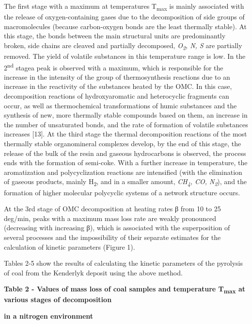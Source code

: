 \begin{multicols}{2}
The first stage with a maximum at temperatures T\textsubscript{max} is
mainly associated with the release of oxygen-containing gases due to the
decomposition of side groups of macromolecules (because carbon-oxygen
bonds are the least thermally stable). At this stage, the bonds between
the main structural units are predominantly broken, side chains are
cleaved and partially decomposed, \emph{O\textsubscript{2}, N, S} are
partially removed. The yield of volatile substances in this temperature
range is low. In the 2\textsuperscript{nd} stagea peak is observed with
a maximum, which is responsible for the increase in the intensity of the
group of thermosynthesis reactions due to an increase in the reactivity
of the substances heated by the OMC. In this case, decomposition
reactions of hydroxyaromatic and heterocyclic fragments can occur, as
well as thermochemical transformations of humic substances and the
synthesis of new, more thermally stable compounds based on them, an
increase in the number of unsaturated bonds, and the rate of formation
of volatile substances increases {[}13{]}. At the third stage the
thermal decomposition reactions of the most thermally stable
organomineral complexes develop, by the end of this stage, the release
of the bulk of the resin and gaseous hydrocarbons is observed, the
process ends with the formation of semi-coke. With a further increase in
temperature, the aromatization and polycyclization reactions are
intensified (with the elimination of gaseous products, mainly
H\textsubscript{2}, and in a smaller amount, \emph{CH\textsubscript{4},
CO, N\textsubscript{2}}), and the formation of higher molecular
polycyclic systems of a network structure occurs.

At the 3rd stage of OMC decomposition at heating rates β from 10 to 25
deg/min, peaks with a maximum mass loss rate are weakly pronounced
(decreasing with increasing β), which is associated with the
superposition of several processes and the impossibility of their
separate estimates for the calculation of kinetic parameters (Figure 1).

Tables 2-5 show the results of calculating the kinetic parameters of the
pyrolysis of coal from the Kenderlyk deposit using the above method.
\end{multicols}

{\bfseries Table 2 - Values of mass loss of coal samples and temperature
T\textsubscript{max} at various stages of decomposition}

{\bfseries in a nitrogen environment}


